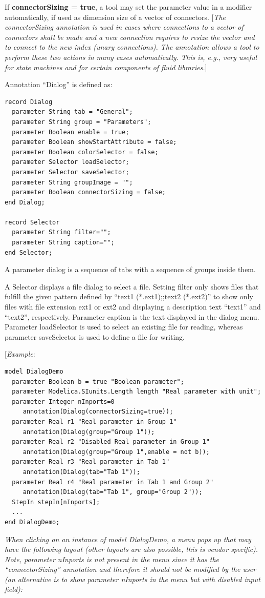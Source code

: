 \documentclass[10pt,a4paper]{report}
\begin{document}
If \textbf{connectorSizing = true}, a tool may set the parameter value
in a modifier automatically, if used as dimension size of a vector of
connectors. {[}\emph{The connectorSizing annotation is used in cases
where connections to a vector of connectors shall be made and a new
connection requires to resize the vector and to connect to the new index
(unary connections). The annotation allows a tool to perform these two
actions in many cases automatically. This is, e.g., very useful for
state machines and for certain components of fluid libraries.}{]}

Annotation ``Dialog'' is defined as:

\begin{lstlisting}[language=modelica]
record Dialog
  parameter String tab = "General";
  parameter String group = "Parameters";
  parameter Boolean enable = true;
  parameter Boolean showStartAttribute = false;
  parameter Boolean colorSelector = false;
  parameter Selector loadSelector;
  parameter Selector saveSelector;
  parameter String groupImage = "";
  parameter Boolean connectorSizing = false;
end Dialog;

record Selector
  parameter String filter="";
  parameter String caption="";
end Selector;
\end{lstlisting}
A parameter dialog is a sequence of tabs with a sequence of groups
inside them.

A Selector displays a file dialog to select a file. Setting filter only
shows files that fulfill the given pattern defined by ``text1
(*.ext1);;text2 (*.ext2)'' to show only files with file extension
ext1 or ext2 and displaying a description text ``text1'' and
``text2'', respectively. Parameter caption is the text displayed in the
dialog menu. Parameter loadSelector is used to select an existing file
for reading, whereas parameter saveSelector is used to define a file for
writing.

{[}\emph{Example}:

\begin{lstlisting}[language=modelica]
model DialogDemo
  parameter Boolean b = true "Boolean parameter";
  parameter Modelica.SIunits.Length length "Real parameter with unit";
  parameter Integer nInports=0 
     annotation(Dialog(connectorSizing=true));
  parameter Real r1 "Real parameter in Group 1"
     annotation(Dialog(group="Group 1"));
  parameter Real r2 "Disabled Real parameter in Group 1"
     annotation(Dialog(group="Group 1",enable = not b));
  parameter Real r3 "Real parameter in Tab 1"
     annotation(Dialog(tab="Tab 1"));
  parameter Real r4 "Real parameter in Tab 1 and Group 2"
     annotation(Dialog(tab="Tab 1", group="Group 2"));
  StepIn stepIn[nInports];
  ...
end DialogDemo;
\end{lstlisting}
\emph{When clicking on an instance of model DialogDemo, a menu pops up
that may have the following layout (other layouts are also possible,
this is vendor specific). Note, parameter nInports is not present in the
menu since it has the ``connectorSizing'' annotation and therefore it
should not be modified by the user (an alternative is to show parameter
nInports in the menu but with disabled input field): }
\end{document}

